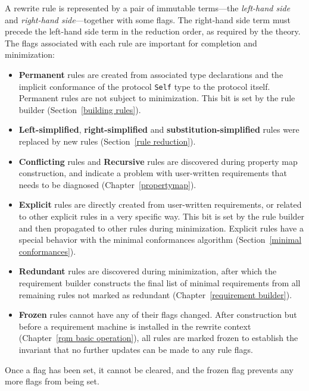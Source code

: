 \documentclass[../generics]{subfiles}
\begin{document}
%
A rewrite rule is represented by a pair of immutable terms---the \emph{left-hand side} and \emph{right-hand side}---together with some flags. The right-hand side term must precede the left-hand side term in the reduction order, as required by the theory. The flags associated with each rule are important for completion and minimization:
\begin{itemize}
%
\item \textbf{Permanent} rules are created from associated type declarations and the implicit conformance of the protocol \texttt{Self} type to the protocol itself. Permanent rules are not subject to minimization. This bit is set by the rule builder (Section~\ref{building rules}).
%
%
%
\item \textbf{Left-simplified}, \textbf{right-simplified} and \textbf{substitution-simplified} rules were replaced by new rules (Section~\ref{rule reduction}).
%
%
\item \textbf{Conflicting} rules and \textbf{Recursive} rules are discovered during property map construction, and indicate a problem with user-written requirements that needs to be diagnosed (Chapter~\ref{propertymap}).
%
\item \textbf{Explicit} rules are directly created from user-written requirements, or related to other explicit rules in a very specific way. This bit is set by the rule builder and then propagated to other rules during minimization. Explicit rules have a special behavior with the minimal conformances algorithm (Section~\ref{minimal conformances}).
%
\item \textbf{Redundant} rules are discovered during minimization, after which the requirement builder constructs the final list of minimal requirements from all remaining rules not marked as redundant (Chapter~\ref{requirement builder}).
%
\item \textbf{Frozen} rules cannot have any of their flags changed. After construction but before a requirement machine is installed in the rewrite context (Chapter~\ref{rqm basic operation}), all rules are marked frozen to establish the invariant that no further updates can be made to any rule flags.
\end{itemize}
Once a flag has been set, it cannot be cleared, and the frozen flag prevents any more flags from being set.
\end{document}
